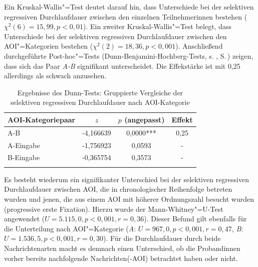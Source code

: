 
Ein Kruskal-Wallis"=Test deutet darauf hin, dass Unterschiede bei der selektiven regressiven Durchlaufdauer zwischen den einzelnen Teilnehmer{\textperiodcentered}innen bestehen ($\chi^2(6) = 15,99, p < 0,01$). Ein zweiter Kruskal-Wallis"=Test belegt, dass Unterschiede bei der selektiven regressiven Durchlaufdauer zwischen den AOI"=Kategorien bestehen ($\chi^2(2) = 18,36, p < 0,001$). Anschließend durchgeführte Post-hoc"=Tests (Dunn-Benjamini-Hochberg-Tests, s. , S.\,\pageref{K6:tab:DeDe:dunntest-pupilsize}) zeigen, dass sich das Paar \emph{A-B} signifikant unterscheidet. Die Effekstärke ist mit 0,25 allerdings als schwach anzusehen.\largerpage[2]


\begin{table}
    \begin{tabular}{lS[table-format=-1.6]S[table-format=1.4{***}]c}  
    \lsptoprule
        {AOI-Kategoriepaar} & {$z$} & {$p$ (angepasst)} & {Effekt} \\
        \midrule
        A-B       & -4,166639 & 0,0000{***} & 0,25 \\ 
        A-Eingabe & -1,756923 & 0,0593 & - \\ 
        B-Eingabe & -0,365754 & 0,3573  & - \\ 
        \lspbottomrule
    \end{tabular}
    \caption{Ergebnisse des Dunn-Tests: Gruppierte Vergleiche der selektiven regressiven Durchlaufdauer nach AOI-Kategorie}
    \label{K6:tab:DeDe:dunntest-iaselregpd}
\end{table}


Es besteht wiederum ein signifikanter Unterschied bei der selektiven regressiven Durchlaufdauer zwischen AOI, die in chronologischer Reihenfolge betreten wurden und jenen, die aus einem AOI mit höherer Ordnungszahl besucht wurden (progressive erste Fixation). Hierzu wurde der Mann-Whitney"=U-Test angewendet ($U = 5.115,0, p < 0,001, r = 0,36$). Dieser Befund gilt ebenfalls für die Unterteilung nach AOI"=Kategorie (\emph{A}: $U = 967,0, p < 0,001, r = 0,47$, \emph{B}: $U = 1.536,5, p < 0,001, r = 0,30$). Für die Durchlaufdauer durch beide Nachrichtenarten macht es demnach einen Unterschied, ob die Proband{\textperiodcentered}innen vorher bereits nachfolgende Nachrichten(-AOI) betrachtet haben oder nicht.

